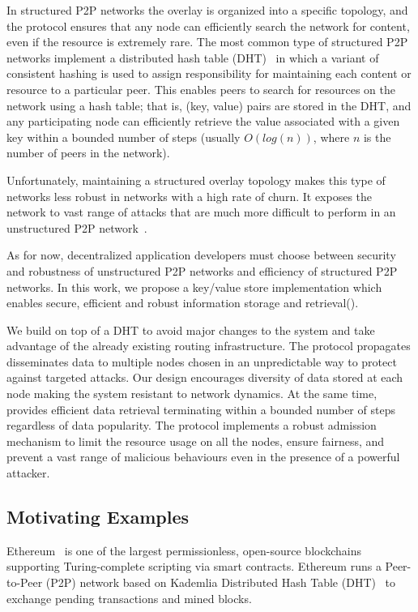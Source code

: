 In structured P2P networks the overlay is organized into a specific topology, and the protocol ensures that any node can efficiently search the network for content, even if the resource is extremely rare. The most common type of structured P2P networks implement a distributed hash table (DHT)~\cite{kademlia, chord, pastry, can, tapestry} in which a variant of consistent hashing is used to assign responsibility for maintaining each content or resource to a particular peer. This enables peers to search for resources on the network using a hash table; that is, (key, value) pairs are stored in the DHT, and any participating node can efficiently retrieve the value associated with a given key within a bounded number of steps (usually $O(log(n))$, where $n$ is the number of peers in the network).

Unfortunately, maintaining a structured overlay topology makes this type of networks less robust in networks with a high rate of churn. It exposes the network to vast range of attacks that are much more difficult to perform in an unstructured P2P network~\cite{Trifa2012TaxonomyOS}.

As for now, decentralized application developers must choose between security and robustness of unstructured P2P networks and efficiency of structured P2P networks. In this work, we propose a key/value store implementation which enables secure,  efficient and robust  information storage and retrieval(\textit{\sysname}).

We build \sysname on top of a DHT to avoid major changes to the system and take advantage of the already existing routing infrastructure. The protocol propagates disseminates data to multiple nodes chosen in an unpredictable way to protect against targeted attacks. Our design encourages diversity of data stored at each node making the system resistant to network dynamics. At the same time, \sysname provides efficient data retrieval terminating within a bounded number of steps  regardless of data popularity. The protocol implements a robust admission mechanism to limit the resource usage on all the nodes, ensure fairness, and prevent a vast range of malicious behaviours even in the presence of a powerful attacker.

\subsection{Motivating Examples}
 Ethereum~\cite{buterin2013ethereum}  is one of the largest permissionless,  open-source  blockchains supporting Turing-complete scripting via smart contracts. Ethereum runs a Peer-to-Peer (P2P) network based on Kademlia Distributed Hash Table (DHT)~\cite{maymounkov2002kademlia} to exchange pending transactions and mined blocks. 

